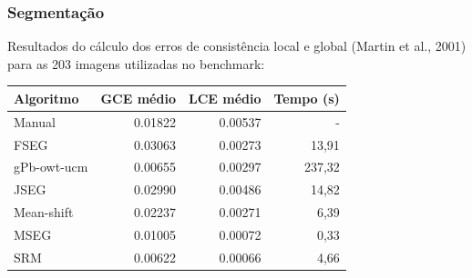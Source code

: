 \documentclass[t]{beamer}
\begin{document}
\begin{frame}[c]
	\frametitle{Segmentação}

	Resultados do cálculo dos erros de consistência local e global (Martin et al., 2001) para as 203 imagens utilizadas no benchmark:

	\small{
	\begin{table}[h]
		\begin{tabulary}{\linewidth}{|L|R|R|R|}
		\hline
			\textbf{Algoritmo} & \textbf{GCE médio} & \textbf{LCE médio} & \textbf{Tempo (s)} \\ \hline
			Manual      & 0.01822          & 0.00537         & - \\ \hline
			FSEG        & 0.03063          & 0.00273         & 13,91 \\ \hline
			gPb-owt-ucm & 0.00655          & 0.00297         & 237,32 \\ \hline
			JSEG        & 0.02990          & 0.00486         & 14,82 \\ \hline
			Mean-shift  & 0.02237          & 0.00271         & 6,39 \\ \hline
			MSEG        & 0.01005          & 0.00072         &  0,33 \\ \hline
			SRM         &  0.00622 &  0.00066 & 4,66 \\ \hline
		\end{tabulary}
	\end{table}
	}
\end{frame}

%
%
%
\end{document}
